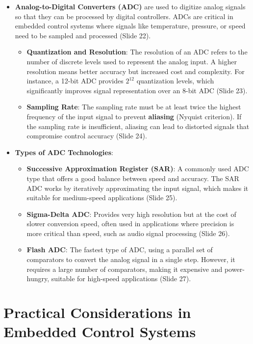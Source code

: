 \documentclass[
  14pt,
  a4paper,
  numbers=noendperiod,
  headinclude=true,
  footinclude=true,
  DIV=calc]{scrreprt}
\begin{document}
\begin{itemize}
\item
  \textbf{Analog-to-Digital Converters (ADC)} are used to digitize
  analog signals so that they can be processed by digital controllers.
  ADCs are critical in embedded control systems where signals like
  temperature, pressure, or speed need to be sampled and processed
  (Slide 22).

  \begin{itemize}
  \item
    \textbf{Quantization and Resolution}: The resolution of an ADC
    refers to the number of discrete levels used to represent the analog
    input. A higher resolution means better accuracy but increased cost
    and complexity. For instance, a 12-bit ADC provides \(2^{12}\)
    quantization levels, which significantly improves signal
    representation over an 8-bit ADC (Slide 23).
  \item
    \textbf{Sampling Rate}: The sampling rate must be at least twice the
    highest frequency of the input signal to prevent \textbf{aliasing}
    (Nyquist criterion). If the sampling rate is insufficient, aliasing
    can lead to distorted signals that compromise control accuracy
    (Slide 24).
  \end{itemize}
\item
  \textbf{Types of ADC Technologies}:

  \begin{itemize}
  \item
    \textbf{Successive Approximation Register (SAR)}: A commonly used
    ADC type that offers a good balance between speed and accuracy. The
    SAR ADC works by iteratively approximating the input signal, which
    makes it suitable for medium-speed applications (Slide 25).
  \item
    \textbf{Sigma-Delta ADC}: Provides very high resolution but at the
    cost of slower conversion speed, often used in applications where
    precision is more critical than speed, such as audio signal
    processing (Slide 26).
  \item
    \textbf{Flash ADC}: The fastest type of ADC, using a parallel set of
    comparators to convert the analog signal in a single step. However,
    it requires a large number of comparators, making it expensive and
    power-hungry, suitable for high-speed applications (Slide 27).
  \end{itemize}
\end{itemize}

\section{Practical Considerations in Embedded Control
Systems}\label{practical-considerations-in-embedded-control-systems}
\end{document}
